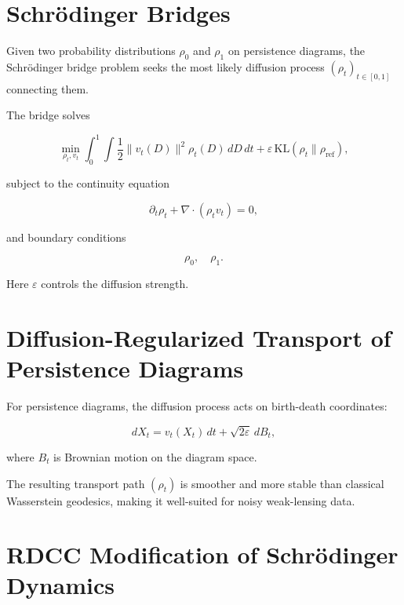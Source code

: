 \documentclass[11pt,a4paper]{article}
\begin{document}
\section{Schrödinger Bridges}

Given two probability distributions $\rho_{0}$ and $\rho_{1}$ on persistence 
diagrams, the Schrödinger bridge problem seeks the most likely diffusion process 
$(\rho_{t})_{t \in [0,1]}$ connecting them.

The bridge solves

\begin{equation}
    \min_{\rho_{t}, v_{t}}
    \int_{0}^{1}
    \int
        \frac{1}{2} \| v_{t}(D) \|^{2} \rho_{t}(D)
    \, dD \, dt
    + \varepsilon \, \mathrm{KL}(\rho_{t} \| \rho_{\mathrm{ref}}),
\end{equation}

subject to the continuity equation

\begin{equation}
    \partial_{t} \rho_{t}
    + \nabla \cdot (\rho_{t} v_{t}) = 0,
\end{equation}

and boundary conditions



\[
    \rho_{0}, \quad \rho_{1}.
\]



Here $\varepsilon$ controls the diffusion strength.
\section{Diffusion-Regularized Transport of Persistence Diagrams}

For persistence diagrams, the diffusion process acts on birth-death coordinates:

\begin{equation}
    dX_{t}
    = v_{t}(X_{t}) \, dt
    + \sqrt{2 \varepsilon} \, dB_{t},
\end{equation}

where $B_{t}$ is Brownian motion on the diagram space.

The resulting transport path $(\rho_{t})$ is smoother and more stable than 
classical Wasserstein geodesics, making it well-suited for noisy weak-lensing 
data.
\section{RDCC Modification of Schrödinger Dynamics}
\end{document}

